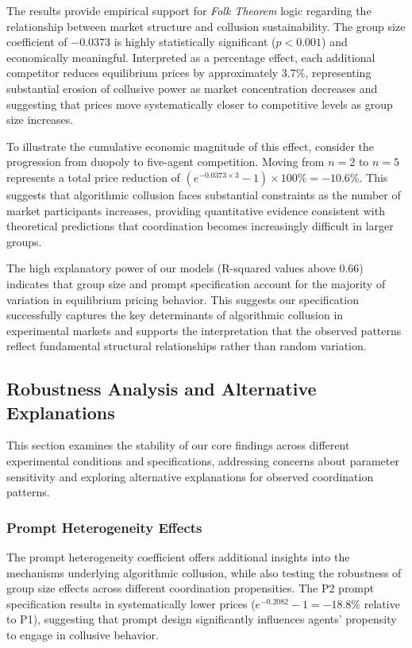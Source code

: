 The results provide empirical support for \emph{Folk Theorem} logic regarding the relationship between market structure and collusion sustainability. The group size coefficient of $-0.0373$ is highly statistically significant ($p < 0.001$) and economically meaningful. Interpreted as a percentage effect, each additional competitor reduces equilibrium prices by approximately 3.7\%, representing substantial erosion of collusive power as market concentration decreases and suggesting that prices move systematically closer to competitive levels as group size increases. 

To illustrate the cumulative economic magnitude of this effect, consider the progression from duopoly to five-agent competition. Moving from $n=2$ to $n=5$ represents a total price reduction of $(e^{-0.0373 \times 3} - 1) \times 100\% = -10.6\%$. This suggests that algorithmic collusion faces substantial constraints as the number of market participants increases, providing quantitative evidence consistent with theoretical predictions that coordination becomes increasingly difficult in larger groups.

The high explanatory power of our models (R-squared values above 0.66) indicates that group size and prompt specification account for the majority of variation in equilibrium pricing behavior. This suggests our specification successfully captures the key determinants of algorithmic collusion in experimental markets and supports the interpretation that the observed patterns reflect fundamental structural relationships rather than random variation.

\subsection{Robustness Analysis and Alternative Explanations}

This section examines the stability of our core findings across different experimental conditions and specifications, addressing concerns about parameter sensitivity and exploring alternative explanations for observed coordination patterns.

\subsubsection*{Prompt Heterogeneity Effects}

The prompt heterogeneity coefficient offers additional insights into the mechanisms underlying algorithmic collusion, while also testing the robustness of group size effects across different coordination propensities. The P2 prompt specification results in systematically lower prices ($e^{-0.2082} - 1 = -18.8\%$ relative to P1), suggesting that prompt design significantly influences agents' propensity to engage in collusive behavior.

